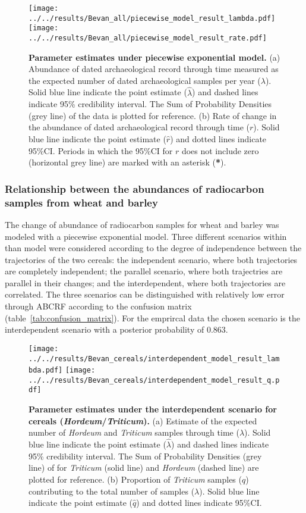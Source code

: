 \documentclass[a4paper]{article}
\begin{document}
\begin{figure}[tbh]
\center\texttt{[image: ../../results/Bevan\_all/piecewise\_model\_result\_lambda.pdf]}
\center\texttt{[image: ../../results/Bevan\_all/piecewise\_model\_result\_rate.pdf]}
\caption{\textbf{Parameter estimates under piecewise exponential model.} (a) Abundance of dated archaeological record through time measured as the expected number of dated archaeological samples per year ($\lambda$). Solid blue line indicate the point estimate ($\hat\lambda$) and dashed lines indicate 95\% credibility interval. The Sum of Probability Densities (grey line) of the data is plotted for reference. (b) Rate of change in the abundance of dated archaeological record through time ($r$). Solid blue line indicate the point estimate ($\hat{r}$) and dotted lines indicate 95\%CI. Periods in which the 95\%CI for $r$ does not include zero (horizontal grey line) are marked with an asterisk (\textbf{*}).}
\label{fig:piecewise_results}
\end{figure}


\subsubsection*{Relationship between the abundances of radiocarbon samples from wheat and barley}

The change of abundance of radiocarbon samples for wheat and barley was modeled with a piecewise exponential model. Three different scenarios within than model were considered according to the degree of independence between the trajectories of the two cereals: the independent scenario, where both trajectories are completely independent; the parallel scenario, where both trajectries are parallel in their changes; and the interdependent, where both trajectories are correlated. The three scenarios can be distinguished with relatively low error through ABCRF according to the confusion matrix (table~\ref{tab:confusion_matrix}). For the emprircal data the chosen scenario is the interdependent scenario with a posterior probability of $0.863$.



\begin{figure}[tbh]
\center\texttt{[image: ../../results/Bevan\_cereals/interdependent\_model\_result\_lambda.pdf]}
\center\texttt{[image: ../../results/Bevan\_cereals/interdependent\_model\_result\_q.pdf]}
\caption{\textbf{Parameter estimates under the interdependent scenario for cereals (\textit{Hordeum}/\emph{Triticum}).} (a) Estimate of the expected number of \textit{Hordeum} and \emph{Triticum} samples through time ($\lambda$). Solid blue line indicate the point estimate ($\hat\lambda$) and dashed lines indicate 95\% credibility interval. The Sum of Probability Densities (grey line) of for \emph{Triticum} (solid line) and \textit{Hordeum} (dashed line) are plotted for reference. (b) Proportion of \emph{Triticum} samples ($q$) contributing to the total number of samples ($\lambda$). Solid blue line indicate the point estimate ($\hat{q}$) and dotted lines indicate 95\%CI.}
\label{fig:cereals_interdependent_results}
\end{figure}
\end{document}
